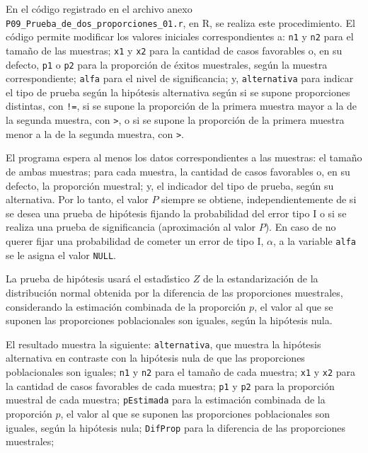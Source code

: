 \begin{solucion}
 En el c\'odigo registrado en el archivo anexo
 \texttt{P09\_Prueba\_de\_dos\_proporciones\_01.r}, en R,
 se realiza este procedimiento.
 El c\'odigo permite modificar los valores iniciales correspondientes a:
 \texttt{n1} y \texttt{n2} para el tama\~no de las muestras;
 \texttt{x1} y \texttt{x2} para la cantidad de casos favorables o,
 en su defecto, \texttt{p1} o \texttt{p2}
 para la proporci\'on de \'exitos muestrales,
 seg\'un la muestra correspondiente;
 \texttt{alfa} para el nivel de significancia;
 y, \texttt{alternativa} para indicar el tipo de prueba seg\'un la hip\'otesis
 alternativa seg\'un si se supone proporciones distintas, con \texttt{!=},
 si se supone la proporci\'on de la primera muestra mayor a la de la segunda muestra,
 con \texttt{>}, o si se supone la proporci\'on de la primera muestra menor
 a la de la segunda muestra, con \texttt{>}.
 \par 
 El programa espera al menos los datos correspondientes a las muestras:
 el tama\~no de ambas muestras; para cada muestra, la cantidad de casos
 favorables o, en su defecto, la proporci\'on muestral;
 y, el indicador del tipo de prueba, seg\'un su alternativa.
 Por lo tanto, el valor $P$ siempre se obtiene,
 independientemente de si se desea una prueba de hip\'otesis
 fijando la probabilidad del error tipo I
 o si se realiza una prueba de significancia (aproximaci\'on al valor $P$).
 En caso de no querer fijar una probabilidad de cometer un error de tipo I,
 $\alpha$, a la variable \texttt{alfa} se le asigna el valor \texttt{NULL}.
 \par 
 La prueba de hip\'otesis usar\'a el estad\'{\i}stico $Z$
 de la estandarizaci\'on de la distribuci\'on normal obtenida por la diferencia
 de las proporciones muestrales,
 considerando la estimaci\'on combinada de la proporci\'on $p$,
 el valor al que se suponen las proporciones poblacionales son iguales,
 seg\'un la hip\'otesis nula.
 \par 
 El resultado muestra la siguiente:
 \texttt{alternativa}, que muestra la hip\'otesis alternativa en contraste
 con la hip\'otesis nula de que las proporciones poblacionales son iguales;
 \texttt{n1} y \texttt{n2} para el tama\~no de cada muestra;
 \texttt{x1} y \texttt{x2} para la cantidad de casos favorables de cada muestra;
 \texttt{p1} y \texttt{p2} para la proporci\'on muestral de cada muestra;
 \texttt{pEstimada} para la estimaci\'on combinada de la proporci\'on $p$,
 el valor al que se suponen las proporciones poblacionales son iguales,
 seg\'un la hip\'otesis nula;
 \texttt{DifProp} para la diferencia de las proporciones muestrales;

\end{solucion}
